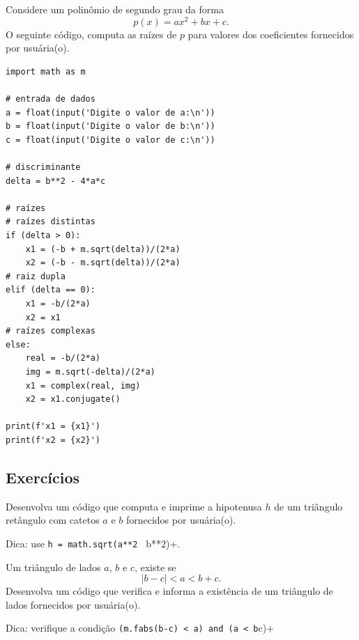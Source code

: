 \begin{ex}
  Considere um polinômio de segundo grau da forma
  \begin{equation}
    p(x) = ax^2 + bx + c.
  \end{equation}
  O seguinte código, computa as raízes de $p$ para valores dos coeficientes fornecidos por usuária(o).

\begin{lstlisting}
import math as m

# entrada de dados
a = float(input('Digite o valor de a:\n'))
b = float(input('Digite o valor de b:\n'))
c = float(input('Digite o valor de c:\n'))

# discriminante
delta = b**2 - 4*a*c

# raízes
# raízes distintas
if (delta > 0):
    x1 = (-b + m.sqrt(delta))/(2*a)
    x2 = (-b - m.sqrt(delta))/(2*a)
# raiz dupla
elif (delta == 0):
    x1 = -b/(2*a)
    x2 = x1
# raízes complexas
else:
    real = -b/(2*a)
    img = m.sqrt(-delta)/(2*a)
    x1 = complex(real, img)
    x2 = x1.conjugate()

print(f'x1 = {x1}')
print(f'x2 = {x2}')
\end{lstlisting}
\end{ex}

\subsection{Exercícios}

\begin{exer}
  Desenvolva um código que computa e imprime a hipotenusa $h$ de um triângulo retângulo com catetos $a$ e $b$ fornecidos por usuária(o).
\end{exer}
\begin{resp}
  Dica: use \lstinline+h = math.sqrt(a**2 + b**2)+.
\end{resp}

\begin{exer}
  Um triângulo de lados $a$, $b$ e $c$, existe se
  \begin{equation}
    |b-c| < a < b + c.
  \end{equation}
  Desenvolva um código que verifica e informa a existência de um triângulo de lados fornecidos por usuária(o).
\end{exer}
\begin{resp}
  Dica: verifique a condição \lstinline+(m.fabs(b-c) < a) and (a < b+c)+
\end{resp}

